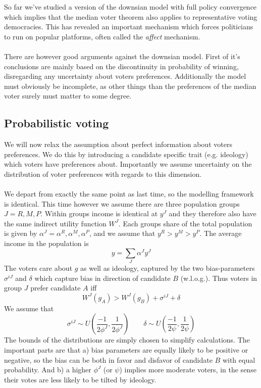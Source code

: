 So far we've studied a version of the downsian model with full policy convergence which implies that the median voter theorem also applies to representative voting democracies. This has revealed an important mechanism which forces politicians to run on popular platforms, often called the \textit{affect} mechanism.
\\ \\ 
There are however good arguments against the downsian model. First of it's conclusions are mainly based on the discontinuity in probability of winning, disregarding any uncertainty about voters preferences. Additionally the model must obviously be incomplete, as other things than the preferences of the median voter surely must matter to some degree. 

\subsection{Probabilistic voting} 
We will now relax the assumption about perfect information about voters preferences. We do this by introducing a candidate specific trait (e.g. ideology) which voters have preferences about. Importantly we assume uncertainty on the distribution of voter preferences with regards to this dimension. 
\\ \\ 
We depart from exactly the same point as last time, so the modelling framework is identical. This time however we assume there are three population groups $J=R,M,P$. Within groups income is identical at $y^J$ and they therefore also have the same indirect utility function $W^J$. Each groups share of the total population is given by $\alpha^J=\alpha^R,\alpha^M, \alpha^P$, and we assume that $y^R>y^M>y^P$. The average income in the population is 
\begin{equation}
    y = \sum_J \alpha^J y^J
\end{equation}
The voters care about $g$ as well as ideology, captured by the two bias-parameters $\sigma^{iJ}$ and $\delta$ which capture bias in direction of candidate $B$ (w.l.o.g.). Thus voters in group $J$ prefer candidate $A$ iff 
\begin{equation} \label{eq: probabilityChoice}
    W^J(g_A) > W^J(g_B) + \sigma^{iJ} + \delta
\end{equation}
We assume that
\begin{equation}
    \sigma^{iJ} \sim U\left(\frac{-1}{2\phi^J},\frac{1}{2\phi^J} \right) \qquad 
   \delta \sim U\left(\frac{-1}{2\psi},\frac{1}{2\psi} \right)
\end{equation}
The bounds of the distributions are simply chosen to simplify calculations. The important parts are that a) bias parameters are equally likely to be positive or negative, so the bias can be both in favor and disfavor of candidate $B$ with equal probability. And b) a higher $\phi^J$ (or $\psi$) implies more moderate voters, in the sense their votes are less likely to be tilted by ideology. 

